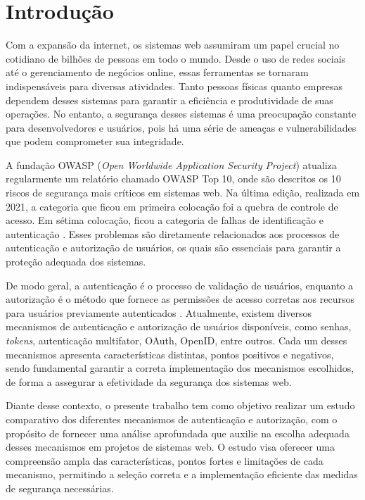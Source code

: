 \section{Introdução}

Com a expansão da internet, os sistemas web assumiram um papel crucial no cotidiano de bilhões de
pessoas em todo o mundo. Desde o uso de redes sociais até o gerenciamento de negócios online, essas
ferramentas se tornaram indispensáveis para diversas atividades. Tanto pessoas físicas quanto
empresas dependem desses sistemas para garantir a eficiência e produtividade de suas operações.
No entanto, a segurança desses sistemas é uma preocupação constante para desenvolvedores e
usuários, pois há uma série de ameaças e vulnerabilidades que podem comprometer sua integridade.

A fundação OWASP (\emph{Open Worldwide Application Security Project}) atualiza regularmente um
relatório chamado OWASP Top 10, onde são descritos os 10 riscos de segurança mais críticos em
sistemas web. Na última edição, realizada em 2021, a categoria que ficou em primeira colocação foi
a quebra de controle de acesso. Em sétima colocação, ficou a categoria de falhas de identificação e
autenticação \cite{OWASP2021}. Esses problemas são diretamente relacionados aos processos de
autenticação e autorização de usuários, os quais são essenciais para garantir a proteção adequada
dos sistemas.

De modo geral, a autenticação é o processo de validação de usuários, enquanto a autorização é o
método que fornece as permissões de acesso corretas aos recursos para usuários previamente
autenticados \cite{TUMIN2012}. Atualmente, existem diversos mecanismos de autenticação e autorização
de usuários disponíveis, como senhas, \emph{tokens}, autenticação multifator, OAuth, OpenID, entre
outros. Cada um desses mecanismos apresenta características distintas, pontos positivos e negativos,
sendo fundamental garantir a correta implementação dos mecanismos escolhidos, de forma a assegurar
a efetividade da segurança dos sistemas web.

Diante desse contexto, o presente trabalho tem como objetivo realizar um estudo
comparativo dos diferentes mecanismos de autenticação e autorização, com o propósito
de fornecer uma análise aprofundada que auxilie na escolha adequada desses mecanismos
em projetos de sistemas web. O estudo visa oferecer uma compreensão ampla das
características, pontos fortes e limitações de cada mecanismo, permitindo a seleção
correta e a implementação eficiente das medidas de segurança necessárias.